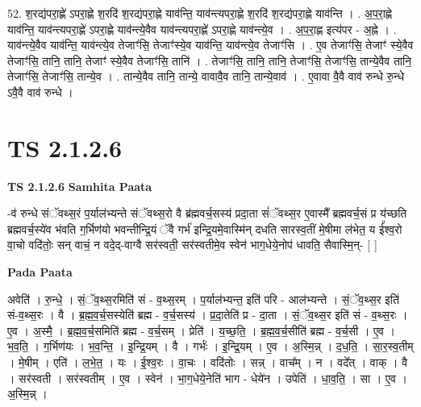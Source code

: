 \documentclass[17pt]{extarticle}
\begin{document}
52. श॒रद्य॑परा॒ह्णे॑ ऽपरा॒ह्णे श॒रदि॑ श॒रद्य॑परा॒ह्णे याव॑न्ति॒ याव॑न्त्यपरा॒ह्णे श॒रदि॑ श॒रद्य॑परा॒ह्णे याव॑न्ति । . अ॒प॒रा॒ह्णे याव॑न्ति॒ याव॑न्त्यपरा॒ह्णे॑ ऽपरा॒ह्णे याव॑न्त्ये॒वैव याव॑न्त्यपरा॒ह्णे॑ ऽपरा॒ह्णे याव॑न्त्ये॒व । . अ॒प॒रा॒ह्ण इत्य॑पर - अ॒ह्ने । . याव॑न्त्ये॒वैव याव॑न्ति॒ याव॑न्त्ये॒व तेजाꣳ॑सि॒ तेजाꣳ॑स्ये॒व याव॑न्ति॒ याव॑न्त्ये॒व तेजाꣳ॑सि । . ए॒व तेजाꣳ॑सि॒ तेजाꣳ॑ स्ये॒वैव तेजाꣳ॑सि॒ तानि॒ तानि॒ तेजाꣳ॑ स्ये॒वैव तेजाꣳ॑सि॒ तानि॑ । . तेजाꣳ॑सि॒ तानि॒ तानि॒ तेजाꣳ॑सि॒ तेजाꣳ॑सि॒ तान्ये॒वैव तानि॒ तेजाꣳ॑सि॒ तेजाꣳ॑सि॒ तान्ये॒व । . तान्ये॒वैव तानि॒ तान्ये॒ वावावै॒व तानि॒ तान्ये॒वाव॑ । . ए॒वावा वै॒वै वाव॑ रुन्धे रु॒न्धे ऽवै॒वै वाव॑ रुन्धे । \newline
\pagebreak
{}

\section{ TS 2.1.2.6 }

\textbf{TS 2.1.2.6 } \newline
\textbf{Samhita Paata} \newline

-व॑ रुन्धे संॅवथ्स॒रं प॒र्याल॑भ्यन्ते संॅवथ्स॒रो वै ब्र॑ह्मवर्च॒सस्य॑ प्रदा॒ता सं॑ॅवथ्स॒र ए॒वास्मै᳚ ब्रह्मवर्च॒सं प्र य॑च्छति ब्रह्मवर्च॒स्ये॑व भ॑वति ग॒र्भिण॑यो भवन्तीन्द्रि॒यं ॅवै गर्भ॑ इन्द्रि॒यमे॒वास्मि॑न् दधति सारस्व॒तीं मे॒षीमा ल॑भेत॒ य ई᳚श्व॒रो वा॒चो वदि॑तोः॒ सन् वाचं॒ न वदे॒द्-वाग्वै सर॑स्वती॒ सर॑स्वतीमे॒व स्वेन॑ भाग॒धेये॒नोप॑ धावति॒ सैवास्मि॒न्-  [  ] \newline

\textbf{Pada Paata} \newline

अवेति॑ । रु॒न्धे॒ । सं॒ॅव॒थ्स॒रमिति॑ सं - व॒थ्स॒रम् । प॒र्याल॑भ्यन्त॒ इति॑ परि - आल॑भ्यन्ते । सं॒ॅव॒थ्स॒र इति॑ सं-व॒थ्स॒रः । वै । ब्र॒ह्म॒व॒र्च॒सस्येति॑ ब्रह्म - व॒र्च॒सस्य॑ । प्र॒दा॒तेति॑ प्र - दा॒ता । सं॒ॅव॒थ्स॒र इति॑ सं - व॒थ्स॒रः । ए॒व । अ॒स्मै॒ । ब्र॒ह्म॒व॒र्च॒समिति॑ ब्रह्म - व॒र्च॒सम् । प्रेति॑ । य॒च्छ॒ति॒ । ब्र॒ह्म॒व॒र्च॒सीति॑ ब्रह्म - व॒र्च॒सी । ए॒व । भ॒व॒ति॒ । ग॒र्भिण॑यः । भ॒व॒न्ति॒ । इ॒न्द्रि॒यम् । वै । गर्भः॑ । इ॒न्द्रि॒यम् । ए॒व । अ॒स्मि॒न्न् । द॒ध॒ति॒ । सा॒र॒स्व॒तीम् । मे॒षीम् । एति॑ । ल॒भे॒त॒ । यः । ई॒श्व॒रः । वा॒चः । वदि॑तोः । सन्न् । वाच᳚म् । न । वदे᳚त् । वाक् । वै । सर॑स्वती । सर॑स्वतीम् । ए॒व । स्वेन॑ । भा॒ग॒धेये॒नेति॑ भाग - धेये॑न । उपेति॑ । धा॒व॒ति॒ । सा । ए॒व । अ॒स्मि॒न्न् ।  \newline
\end{document}
